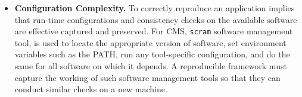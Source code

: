 \begin{itemize}

\item {\bf Configuration Complexity.} To correctly reproduce an application implies that run-time configurations and consistency checks on the available software are effective captured and preserved. 
For CMS,  {\tt scram} software management tool, is used to locate
the appropriate version of software,  set environment variables such as the PATH, run any
tool-specific configuration, and do the same for all software on which it depends. A reproducible framework must capture the working of such software management tools so that they can conduct similar
checks on a new machine. 



\end{itemize}
